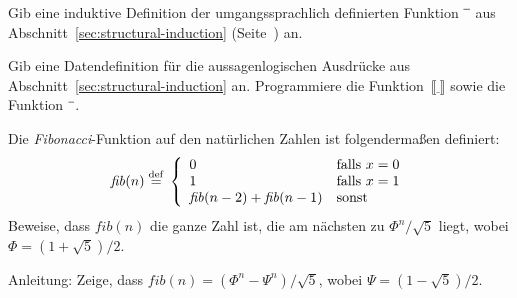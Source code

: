 \begin{aufgabe}
  Gib eine induktive Definition der umgangssprachlich
  definierten Funktion $\overline{\raisebox{1ex}{\hspace{1ex}}}$ aus
  Abschnitt~\ref{sec:structural-induction}
  (Seite~\pageref{page:overline}) an.
\end{aufgabe}

\begin{aufgabe}
  Gib eine Datendefinition für die aussagenlogischen Ausdrücke
  aus Abschnitt~\ref{sec:structural-induction} an.  Programmiere
  die Funktion~$\llbracket\underline{~}\rrbracket$ sowie die Funktion 
  $\overline{\raisebox{1ex}{\hspace{1ex}}}$.
\end{aufgabe}

\begin{aufgabe}
  Die \textit{Fibonacci}-Funktion auf den natürlichen Zahlen ist
  folgendermaßen definiert:
%
  \begin{displaymath}
    \mathit{fib}(n) \stackrel{\rm def}{=}{} \left\{
      \begin{array}{ll}
        0 & \textrm{falls } x = 0\\
        1 & \textrm{falls } x = 1\\
        \mathit{fib}(n-2) + \mathit{fib}(n-1) & \textrm{sonst}
      \end{array}\right.
    \end{displaymath}
%
    Beweise, dass $\mathit{fib}(n)$ die ganze Zahl ist, die am nächsten
    zu $\Phi^n/\sqrt{5}$ liegt, wobei $\Phi = (1+\sqrt{5})/2$.
    
    Anleitung: Zeige, dass $\mathit{fib}(n) = (\Phi^n -
    \Psi^n)/\sqrt{5}$, wobei $\Psi = (1-\sqrt{5})/2$.
\end{aufgabe}

